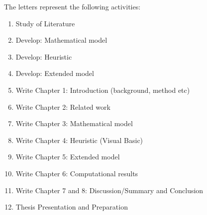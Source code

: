 \documentclass{article}
\begin{document}
The letters represent the following activities:

\begin{enumerate}[label=(\Alph*)]
\item Study of Literature
\item Develop: Mathematical model
\item Develop: Heuristic
\item Develop: Extended model
\item Write Chapter 1: Introduction (background, method etc)
\item Write Chapter 2: Related work
\item Write Chapter 3: Mathematical model
\item Write Chapter 4: Heuristic (Visual Basic)
\item Write Chapter 5: Extended model
\item Write Chapter 6: Computational results
\item Write Chapter 7 and 8: Discussion/Summary and Conclusion
\item Thesis Presentation and Preparation \\
\end{enumerate}
\end{document}
